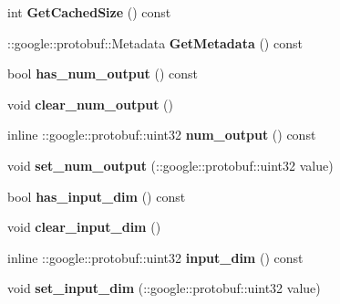 \begin{DoxyCompactItemize}
int {\bfseries Get\+Cached\+Size} () const
\item 
\mbox{\label{classcaffe_1_1_embed_parameter_af336187891d728fece09fa228a159075}} 
\+::google\+::protobuf\+::\+Metadata {\bfseries Get\+Metadata} () const
\item 
\mbox{\label{classcaffe_1_1_embed_parameter_a3478cd7f7819750c70c20d49c4418bc6}} 
bool {\bfseries has\+\_\+num\+\_\+output} () const
\item 
\mbox{\label{classcaffe_1_1_embed_parameter_a080d77abd7e17a87df5dd2ca44029797}} 
void {\bfseries clear\+\_\+num\+\_\+output} ()
\item 
\mbox{\label{classcaffe_1_1_embed_parameter_a6f77a04663f7d0e16f08f2326c03cee3}} 
inline \+::google\+::protobuf\+::uint32 {\bfseries num\+\_\+output} () const
\item 
\mbox{\label{classcaffe_1_1_embed_parameter_a0debd9af4a8e2084e0198c6897b9e520}} 
void {\bfseries set\+\_\+num\+\_\+output} (\+::google\+::protobuf\+::uint32 value)
\item 
\mbox{\label{classcaffe_1_1_embed_parameter_a1c2996a655b140101a64e9e7aebe2b83}} 
bool {\bfseries has\+\_\+input\+\_\+dim} () const
\item 
\mbox{\label{classcaffe_1_1_embed_parameter_ab1a4f02f1c4f1df96e10fbd600108a60}} 
void {\bfseries clear\+\_\+input\+\_\+dim} ()
\item 
\mbox{\label{classcaffe_1_1_embed_parameter_acb01dc2a06f1fc5e94bde5894fd48a37}} 
inline \+::google\+::protobuf\+::uint32 {\bfseries input\+\_\+dim} () const
\item 
\mbox{\label{classcaffe_1_1_embed_parameter_a0149bfd98482f2b0024b9dd61864129f}} 
void {\bfseries set\+\_\+input\+\_\+dim} (\+::google\+::protobuf\+::uint32 value)
\item 
\mbox{\label{classcaffe_1_1_embed_parameter_a4cfd09bf37df87cbb6e564f872313028}} 

\end{DoxyCompactItemize}
